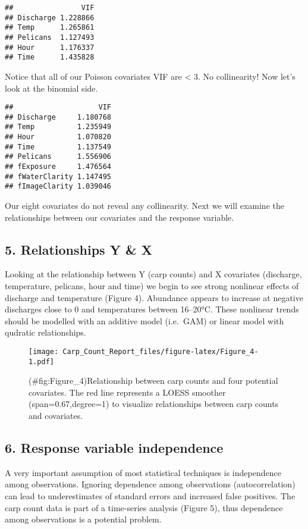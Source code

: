 \documentclass[]{article}
\begin{document}
\begin{verbatim}
##                VIF
## Discharge 1.228866
## Temp      1.265861
## Pelicans  1.127493
## Hour      1.176337
## Time      1.435828
\end{verbatim}

Notice that all of our Poisson covariates VIF are \textless{} 3. No
collinearity! Now let's look at the binomial side.

\begin{verbatim}
##                    VIF
## Discharge     1.180768
## Temp          1.235949
## Hour          1.070820
## Time          1.137549
## Pelicans      1.556906
## fExposure     1.476564
## fWaterClarity 1.147495
## fImageClarity 1.039046
\end{verbatim}

Our eight covariates do not reveal any collinearity. Next we will
examine the relationships between our covariates and the response
variable.

\subsection{5. Relationships Y \& X}\label{relationships-y-x}

Looking at the relationship between Y (carp counts) and X covariates
(discharge, temperature, pelicans, hour and time) we begin to see strong
nonlinear effects of discharge and temperature (Figure 4). Abundance
appears to increase at negative discharges close to 0 and temperatures
between 16--20°C. These nonlinear trends should be modelled with an
additive model (i.e.~GAM) or linear model with qudratic relationships.

\begin{figure}[htbp]
\centering
\texttt{[image: Carp\_Count\_Report\_files/figure-latex/Figure\_4-1.pdf]}
\caption{(\#fig:Figure\_4)Relationship between carp counts and four
potential covariates. The red line represents a LOESS smoother
(span=0.67,degree=1) to visualize relationships between carp counts and
covariates.}
\end{figure}

\subsection{6. Response variable
independence}\label{response-variable-independence}

A very important assumption of most statistical techniques is
independence among observations. Ignoring dependence among observations
(autocorrelation) can lead to underestimates of standard errors and
increased false positives. The carp count data is part of a time-series
analysis (Figure 5), thus dependence among observations is a potential
problem.
\end{document}

